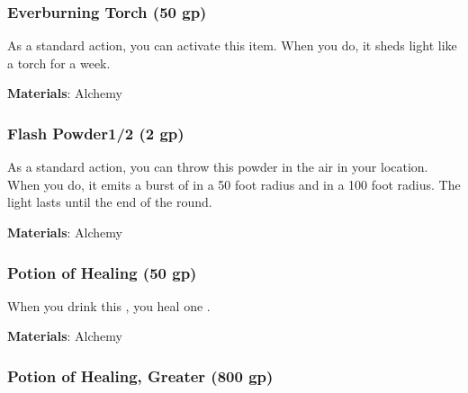 \lowercase{\hypertarget{item:Everburning Torch}{}}\label{item:Everburning Torch}
\hypertarget{item:Everburning Torch}{\subsubsection{Everburning Torch\hfill{} (50 gp)}}

As a standard action, you can activate this item.
When you do, it sheds light like a torch for a week.



\vspace{0.25em}
\textbf{Materials}: Alchemy


\lowercase{\hypertarget{item:Flash Powder}{}}\label{item:Flash Powder}
\hypertarget{item:Flash Powder}{\subsubsection{Flash Powder\hfill1/2 (2 gp)}}

As a standard action, you can throw this powder in the air in your location.
When you do, it emits a burst of  in a 50 foot radius and  in a 100 foot radius.
The light lasts until the end of the round.



\vspace{0.25em}
\textbf{Materials}: Alchemy


\lowercase{\hypertarget{item:Potion of Healing}{}}\label{item:Potion of Healing}
\hypertarget{item:Potion of Healing}{\subsubsection{Potion of Healing\hfill{} (50 gp)}}

When you drink this , you heal one .



\vspace{0.25em}
\textbf{Materials}: Alchemy


\lowercase{\hypertarget{item:Potion of Healing, Greater}{}}\label{item:Potion of Healing, Greater}
\hypertarget{item:Potion of Healing, Greater}{\subsubsection{Potion of Healing, Greater\hfill{} (800 gp)}}

